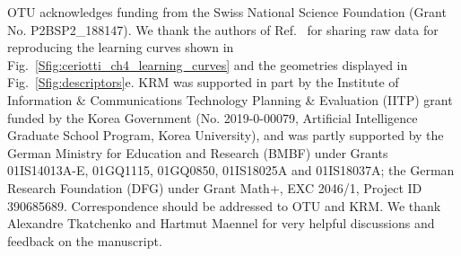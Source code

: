 \documentclass[%
superscriptaddress,
reprint,
nofootinbib,
amsmath,amssymb,amsfonts,
floatfix,
altaffilletter,
showkeys,
]{revtex4-2}
\begin{document}
\begin{acknowledgments}
OTU acknowledges funding from the Swiss National Science
Foundation (Grant No. P2BSP2\_188147). We thank the authors of Ref.~ for sharing raw data for reproducing the learning curves shown in Fig.~\ref{Sfig:ceriotti_ch4_learning_curves} and the geometries displayed in Fig.~\ref{Sfig:descriptors}e.
KRM was supported in part by the Institute of Information \& Communications Technology Planning \& Evaluation (IITP) grant funded by the Korea Government (No. 2019-0-00079,  Artificial Intelligence Graduate School Program, Korea University), and was partly supported by the German Ministry for Education and Research (BMBF) under Grants 01IS14013A-E, 01GQ1115, 01GQ0850, 01IS18025A and 01IS18037A; the German Research Foundation (DFG) under Grant Math+, EXC 2046/1, Project ID 390685689. Correspondence should be addressed to OTU and KRM.
We thank Alexandre Tkatchenko and Hartmut Maennel for very helpful discussions and feedback on the manuscript.
\end{acknowledgments}


\end{document}
